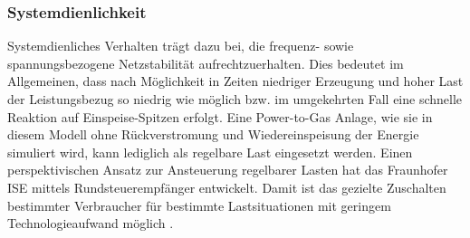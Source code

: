 \documentclass[onecolumn,10pt,titlepage]{article}
\begin{document}
\subsubsection{Systemdienlichkeit}
Systemdienliches Verhalten trägt dazu bei, die frequenz- sowie spannungsbezogene Netzstabilität aufrechtzuerhalten. Dies bedeutet im Allgemeinen, dass nach Möglichkeit in Zeiten niedriger Erzeugung und hoher Last der Leistungsbezug so niedrig wie möglich bzw. im umgekehrten Fall eine schnelle Reaktion auf Einspeise-Spitzen erfolgt.
Eine Power-to-Gas Anlage, wie sie in diesem Modell ohne Rückverstromung und Wiedereinspeisung der Energie simuliert wird, kann lediglich als regelbare Last eingesetzt werden. Einen perspektivischen Ansatz zur Ansteuerung regelbarer Lasten hat das Fraunhofer ISE mittels Rundsteuerempfänger entwickelt. Damit ist das gezielte Zuschalten bestimmter Verbraucher für bestimmte Lastsituationen mit geringem Technologieaufwand möglich \cite{Schneider2018}.

%
\end{document}
